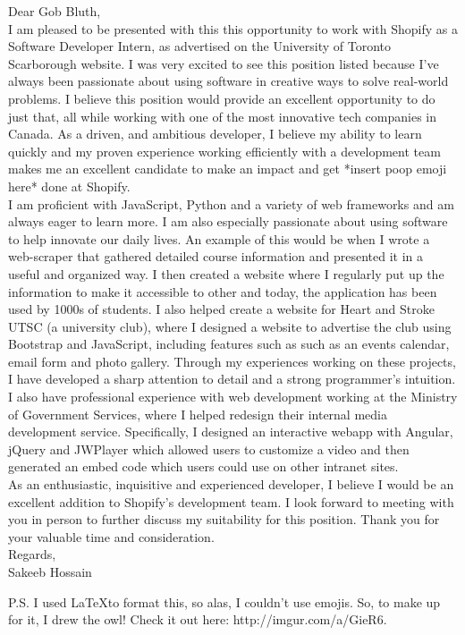 \documentclass[]{deedy-resume-openfont}
\begin{document}
\begin{minipage}{0.80\textwidth}

Dear Gob Bluth,\\

I am pleased to be presented with this this opportunity to work with Shopify as a Software Developer Intern, as advertised on the University of Toronto Scarborough website. I was very excited to see this position listed because I’ve always been passionate about using software in creative ways to solve real-world problems. I believe this position would provide an excellent opportunity to do just that, all while working with one of the most innovative tech companies in Canada. As a driven, and ambitious developer, I believe my ability to learn quickly and my proven experience working efficiently with a development team makes me an excellent candidate to make an impact and get *insert poop emoji here* done at Shopify.\\

I am proficient with JavaScript, Python and a variety of web frameworks and am always eager to learn more. I am also especially passionate about using software to help innovate our daily lives. An example of this would be when I wrote a web-scraper that gathered detailed course information and presented it in a useful and organized way. I then created a website where I regularly put up the information to make it accessible to other and today, the application has been used by 1000s of students. I also helped create a website for Heart and Stroke UTSC (a university club), where I designed a website to advertise the club using Bootstrap and JavaScript, including features such as such as an events calendar, email form and photo gallery. Through my experiences working on these projects, I have developed a sharp attention to detail and a strong programmer’s intuition. \\

I also have professional experience with web development working at the Ministry of Government Services, where I helped redesign their internal media development service. Specifically, I designed an interactive webapp with Angular, jQuery and JWPlayer which allowed users to customize a video and then generated an embed code which users could use on other intranet sites. \\

As an enthusiastic, inquisitive and experienced developer, I believe I would be an excellent addition to Shopify’s development team. I look forward to meeting with you in person to further discuss my suitability for this position. Thank you for your valuable time and consideration. \\

Regards,\\
Sakeeb Hossain \\

\leavevmode \newline

P.S. I used \LaTeX \space to format this, so alas, I couldn't use emojis. So, to make up for it, I drew the owl! Check it out here: http://imgur.com/a/GieR6.

\end{minipage}
\end{document}
